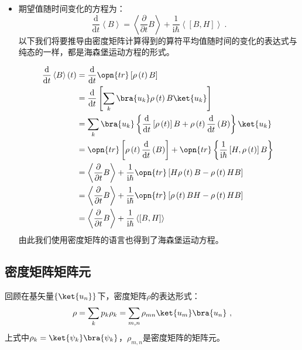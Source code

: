 \begin{itemize}
\item 期望值随时间变化的方程为：
    \begin{equation}
    \frac{\mathrm{d}}{\mathrm{d}t}\left\langle B \right\rangle = \left\langle \frac{\partial}{\partial t} B \right\rangle + \frac{1}{\mathrm{i}\hbar}\left\langle \left[ B, H \right]\right\rangle~.
    \end{equation}
    以下我们将要推导由密度矩阵计算得到的算符平均值随时间的变化的表达式与纯态的一样，都是海森堡运动方程的形式。
    
    \begin{equation}
    \begin{aligned}
    \frac{\mathrm{d}}{\mathrm{d}t}\left\langle B \right\rangle \left( t \right) &= \frac{\mathrm{d}}{\mathrm{d}t}\opn{tr}\left[\rho\left(t\right)B\right] \\
    &=\frac{\mathrm{d}}{\mathrm{d}t}\left[ \sum\limits_k \bra{u_k}\rho\left(t\right)B\ket{u_k}     \right] \\
    &= \sum\limits_k\bra{u_k}\left\{ \frac{\mathrm{d}}{\mathrm{d} t}\left[\rho \left(t\right)\right]B + \rho\left(t\right)\frac{\mathrm{d}}{\mathrm{d}t}\left( B\right) \right\}\ket{u_k} \\
    &=\opn{tr}\left[ \rho\left(t\right)\frac{\mathrm{d}}{\mathrm{d}t}\left(B\right) \right] + \opn{tr}\left\{\frac{1}{\mathrm{i}\hbar}\left[H,\rho\left(t\right)\right]B\right\} \\
    &=\left\langle \frac{\partial}{\partial t} B \right\rangle + \frac{1}{\mathrm{i}\hbar}\opn{tr}\left[H\rho\left(t\right)B - \rho\left(t\right)HB\right] \\
    &=\left\langle \frac{\partial}{\partial t}B\right\rangle + \frac{1}{\mathrm{i}\hbar}\opn{tr}\left[\rho\left(t\right)BH - \rho \left(t\right)HB\right] \\
    &=\left\langle\frac{\partial}{\partial t}B\right\rangle + \frac{1}{\mathrm{i}\hbar}\left\langle\left[B,H\right]\right\rangle
    \end{aligned}~
    \end{equation}
    由此我们使用密度矩阵的语言也得到了海森堡运动方程。



\end{itemize}
\subsection{密度矩阵矩阵元}


回顾在基矢量$\left\{ \ket{u_n}\right\}$下，密度矩阵$\rho$的表达形式：
$$\rho = \sum\limits_k p_k\rho_k = \sum\limits_{m,n}\rho_{mn}\ket{u_m}\bra{u_n} ~,$$
上式中$\rho_k = \ket{\psi_k}\bra{\psi_k}$，$\rho_{m,n}$是密度矩阵的矩阵元。

